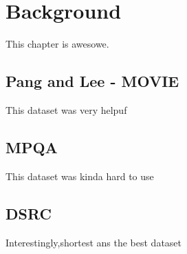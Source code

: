 \chapter{Background}

This chapter is awesowe.

\section{ Pang and Lee - MOVIE }

This dataset was very helpuf

\section{ MPQA }

This dataset was kinda hard to use

\section{ DSRC }

Interestingly,shortest ans the best dataset